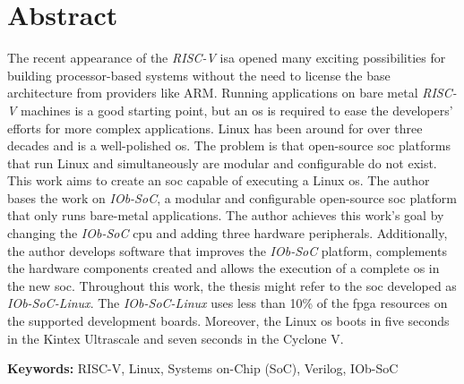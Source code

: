 \cleardoubleoddpage

\chapter*{Abstract}
\thispagestyle{empty} %
The recent appearance of the \textit{RISC-V} \acrshort{isa} opened many exciting possibilities for building processor-based systems without the need to license the base architecture from providers like ARM. Running applications on bare metal \textit{RISC-V} machines is a good starting point, but an \acrshort{os} is required to ease the developers' efforts for more complex applications. Linux has been around for over three decades and is a well-polished \acrshort{os}. The problem is that open-source \acrshort{soc} platforms that run Linux and simultaneously are modular and configurable do not exist.
This work aims to create an \acrshort{soc} capable of executing a Linux \acrshort{os}. The author bases the work on \textit{IOb-SoC}, a modular and configurable open-source \acrshort{soc} platform that only runs bare-metal applications. The author achieves this work's goal by changing the \textit{IOb-SoC} \acrshort{cpu} and adding three hardware peripherals. Additionally, the author develops software that improves the \textit{IOb-SoC} platform, complements the hardware components created and allows the execution of a complete \acrshort{os} in the new \acrshort{soc}. Throughout this work, the thesis might refer to the \acrshort{soc} developed as \textit{IOb-SoC-Linux}.
The \textit{IOb-SoC-Linux} uses less than 10\% of the \acrshort{fpga} resources on the supported development boards. Moreover, the Linux \acrshort{os} boots in five seconds in the Kintex Ultrascale and seven seconds in the Cyclone V.


\vfill

\textbf{\Large Keywords:} RISC-V, Linux, Systems on-Chip (SoC), Verilog, IOb-SoC